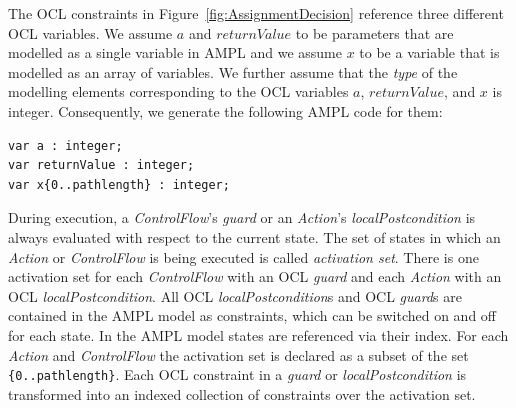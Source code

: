 \documentclass[runningheads,a4paper]{llncs}%
\newcommand{\UMLType}[1]{\textsf{\textit{#1}}} %
\newcommand{\UMLReference}[1]{\textsf{\textit{#1}}} %
\newcommand{\AMPLCode}[1]{\texttt{#1}}
\begin{document}
The OCL constraints in Figure~\ref{fig:AssignmentDecision} reference three
different OCL variables. We assume $a$ and $returnValue$ to be parameters that
are modelled as a single variable in AMPL and we assume $x$ to be a variable that
is modelled as an array of variables. We further assume that the
\UMLReference{type} of the modelling elements corresponding to the OCL variables
$a$, ${returnValue}$, and $x$ is integer. Consequently, we generate the
following AMPL code for them: %
\begin{lstlisting}[basicstyle=\ttfamily,language=ampl]
var a : integer;
var returnValue : integer;
var x{0..pathlength} : integer;
\end{lstlisting}%

During execution, a \UMLType{ControlFlow}'s \UMLReference{guard} or an
\UMLType{Action}'s \UMLReference{localPostcondition} is always evaluated with
respect to the current state. The set of states in which an \UMLType{Action} or
\UMLType{ControlFlow} is being executed is called \emph{activation set}. There
is one activation set for each \UMLType{ControlFlow} with an OCL
\UMLReference{guard} and each \UMLType{Action} with an OCL
\UMLReference{localPostcondition}. All OCL \UMLReference{localPostcondition}s
and OCL \UMLReference{guard}s are contained in the AMPL model as constraints,
which can be switched on and off for each state. In the AMPL model states are
referenced via their index. For each \UMLType{Action} and \UMLType{ControlFlow}
the activation set is declared as a subset of the set
\AMPLCode{\{0..pathlength\}}. Each OCL constraint in a \UMLReference{guard} or
\UMLReference{localPostcondition} is transformed into an indexed collection of
constraints over the activation set.
\end{document}
